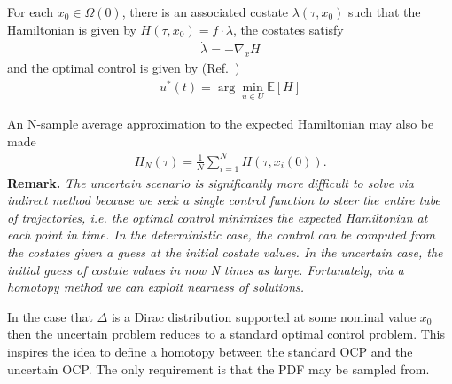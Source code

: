 \documentclass[10pt,a4paper]{article}
\begin{document}
	For each $x_0 \in \Omega(0)$, there is an associated costate $\lambda(\tau, x_0)$ such that the Hamiltonian is given by $H(\tau, x_0) = f\cdot\lambda$, the costates satisfy
	\begin{align}
	\dot{\lambda} = -\nabla_xH
	\end{align} 
	and the optimal control is given by (Ref.~\cite{RSOptimalControl})
	\begin{align}
	u^*(t) = \arg\min_{u\in U}\mathbb{E}[H] \label{eq_uncertain_optimal_control}
	\end{align}
	
	An N-sample average approximation to the expected Hamiltonian may also be made
	\begin{align}
		H_N(\tau) = \frac{1}{N}\sum_{i=1}^{N}H(\tau,x_i(0)). \label{eq_saa_hamil}
	\end{align}	
	\textbf{Remark.} \textit{The uncertain scenario is significantly more difficult to solve via indirect method because we seek a single control function to steer the entire tube of trajectories, i.e. the optimal control minimizes the expected Hamiltonian at each point in time. In the deterministic case, the control can be computed from the costates given a guess at the initial costate values. In the uncertain case, the initial guess of costate values in now N times as large. Fortunately, via a homotopy method we can exploit nearness of solutions.}	
		
		
	In the case that $\Delta$ is a Dirac distribution supported at some nominal value $x_0$ then the uncertain problem reduces to a standard optimal control problem. This inspires the idea to define a homotopy between the standard OCP and the uncertain OCP. The only requirement is that the PDF may be sampled from. 
	
	
\end{document}

